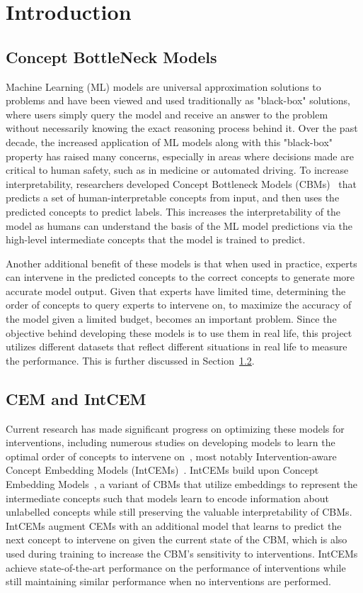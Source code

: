 \documentclass[../main.tex]{subfiles}
\begin{document}
\chapter{Introduction}
\label{firstcontentpage}

\section{Concept BottleNeck Models}
Machine Learning (ML) models are universal approximation solutions to problems
and have been viewed and used traditionally as "black-box" solutions, 
where users simply query the model and receive an answer to the problem without 
necessarily knowing the exact reasoning process behind it. Over the past decade,
the increased application of ML models along with this "black-box" property has
raised many concerns, especially in areas where decisions made are critical to
human safety, such as in medicine or automated driving. To increase
interpretability, researchers developed Concept Bottleneck Models (CBMs)~\cite{cbm} that 
predicts a set of human-interpretable concepts from input, and then uses the
predicted concepts to predict labels. This increases the interpretability of the model 
as humans
can understand the basis of the ML model predictions via the high-level 
intermediate concepts that the model is trained to predict. 

Another additional benefit of these models is that when used in 
practice, experts can intervene in the predicted concepts to the correct concepts to 
generate more accurate model output.
Given that experts have limited time, determining 
the order of concepts to query experts to intervene on, 
to maximize the accuracy of the model given a limited budget, becomes an important problem.
Since the objective behind developing these models is to
use them in real life, this project utilizes different
datasets that reflect different situations in real life
to measure the performance. 
This is further discussed in Section~\ref{}.

\section{CEM and IntCEM}
Current research has made significant progress on optimizing these models for interventions,
including numerous studies on developing models to learn
the optimal order of concepts to intervene on~\cite{coop},
most notably Intervention-aware Concept Embedding Models (IntCEMs)~\cite{intcem}. IntCEMs build upon 
Concept Embedding Models~\cite{cem}, a variant of CBMs that utilize 
embeddings to represent the intermediate concepts such that models
learn to encode information about unlabelled concepts while still preserving
the valuable interpretability of CBMs. IntCEMs augment CEMs with an additional
model that learns to predict the next concept to intervene on given the current state
of the CBM, which is also used during training to increase the CBM's
sensitivity to interventions. IntCEMs achieve state-of-the-art performance on
the performance of interventions while still maintaining similar performance when
no interventions are performed.
\end{document}

